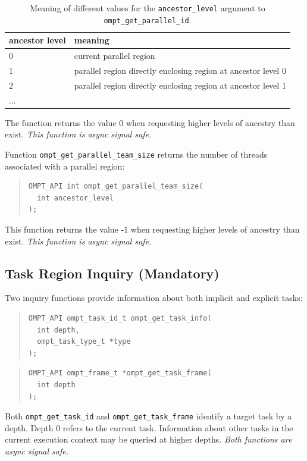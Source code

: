 \documentclass{article}
\begin{document}
\begin{table}
\centering
\begin{tabular}{|l|l|}
\hline
ancestor level  & meaning\\\hline
 0 & current parallel region  \\\hline
1 &parallel region directly enclosing region at ancestor level 0 \\\hline
2 & parallel region directly enclosing region at ancestor level 1 \\\hline
... & \\\hline
\end{tabular}
\caption{Meaning of different  values for the {\tt ancestor\_level} argument to {\tt ompt\_get\_parallel\_id}.}
\label{tab:ancestor}
\end{table}
 
 The function returns the value 0 when requesting higher levels of
 ancestry than exist.  {\em This function is async signal safe.}
 
 Function \verb|ompt_get_parallel_team_size| returns  
 the number of threads associated with a parallel region:
 
 
\begin{quote}
\begin{verbatim}
OMPT_API int ompt_get_parallel_team_size(
  int ancestor_level
);
\end{verbatim}
\end{quote}

\noindent
 This function returns the value -1 when requesting higher levels of
 ancestry than exist.  {\em This function is async signal safe.}


 
\subsection{Task Region Inquiry (Mandatory)}
\label{sec:task-region}

Two inquiry functions provide information about both implicit and explicit tasks:

\begin{quote}
\begin{verbatim}
OMPT_API ompt_task_id_t ompt_get_task_info(
  int depth,
  ompt_task_type_t *type
);
\end{verbatim}
\end{quote}

\begin{quote}
\begin{verbatim}
OMPT_API ompt_frame_t *ompt_get_task_frame(
  int depth
);
\end{verbatim}
\end{quote}
Both 
\verb|ompt_get_task_id|  and  \verb|ompt_get_task_frame| identify a target task by a depth. Depth 0 refers to the current task. 
Information about other tasks in the current execution context may be queried at higher depths. 
{\em Both functions are async signal safe.} 
\end{document}
